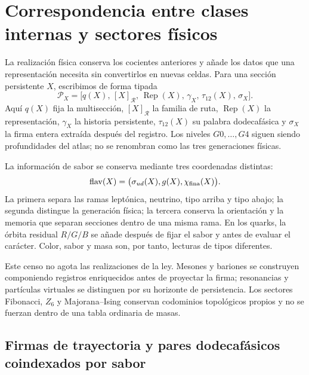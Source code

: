\chapter[Correspondencia con sectores físicos]{Correspondencia entre clases internas y sectores físicos}
\label{sec:censo-fisico-atlas-rev7}

La realización física conserva los cocientes anteriores y añade los datos
que una representación necesita sin convertirlos en nuevas celdas. Para una
sección persistente \(X\), escribimos de forma tipada
\[
 \mathcal P_X=
 \bigl[q(X),\,[X]_{\mathcal R},\,\operatorname{Rep}(X),\,
       \gamma_X,\,\tau_{12}(X),\,\sigma_X\bigr].
\]
Aquí \(q(X)\) fija la multisección, \([X]_{\mathcal R}\) la familia de ruta,
\(\operatorname{Rep}(X)\) la representación, \(\gamma_X\) la historia
persistente, \(\tau_{12}(X)\) su palabra dodecafásica y \(\sigma_X\) la firma
entera extraída después del registro. Los niveles \(G0,\ldots,G4\) siguen
siendo profundidades del atlas; no se renombran como las tres generaciones
físicas.

La información de sabor se conserva mediante tres coordenadas distintas:
\[
 \operatorname{flav}(X)=
 \bigl(\sigma_{ud}(X),g(X),\chi_{\rm fina}(X)\bigr).
\]
La primera separa las ramas leptónica, neutrino, tipo arriba y tipo abajo;
la segunda distingue la generación física; la tercera conserva la
orientación y la memoria que separan secciones dentro de una misma rama. En
los quarks, la órbita residual \(R/G/B\) se añade después de fijar el sabor y
antes de evaluar el carácter. Color, sabor y masa son, por tanto, lecturas de
tipos diferentes.


Este censo no agota las realizaciones de la ley. Mesones y bariones se
construyen componiendo registros enriquecidos antes de proyectar la firma;
resonancias y partículas virtuales se distinguen por su horizonte de
persistencia. Los sectores Fibonacci, \(Z_6\) y Majorana--Ising conservan
codominios topológicos propios y no se fuerzan dentro de una tabla ordinaria
de masas.

\section{Firmas de trayectoria y pares dodecafásicos coindexados por sabor}

